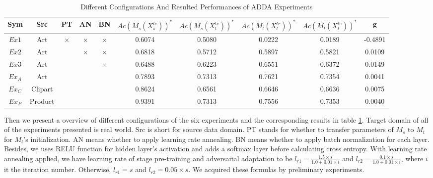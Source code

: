\documentclass[conference]{IEEEtran}
\begin{document}
 \begin{table}[h]
	\centering
	\caption{Different Configurations And Resulted Performances of ADDA Experiments}
	\label{tab:ConfigADDA}
	\begin{tabular}{cccccccccc}
		\hline
		Sym & Src & PT & AN & BN & $Ac(M_s(X^{te}_s))^*$ & $Ac(M_s(X^{te}_t))^*$ & $Ac(M_t(X^{tr}_t))^*$ & $Ac(M_t(X^{te}_t))^*$ & g\\
		\hline
		\hline
        $Ex1$ & Art & $\times$ & $\times$ & $\times$ & 0.6074 & 0.5080 & 0.0222 & 0.0189  & -0.4891\\
		$Ex2$ &  Art & \checkmark & $\times$ & $\times$ & 0.6818 & 0.5712 & 0.5897 & 0.5821 & 0.0109\\
		$Ex3$ &  Art & \checkmark & \checkmark & $\times$ & 0.6488 & 0.6223 & 0.6551 & 0.6372 & 0.0149\\
		$Ex_A$ &  Art & \checkmark & \checkmark & \checkmark & 0.7893 & 0.7313 & 0.7621 & 0.7354 & 0.0041\\
		$Ex_C$ &  Clipart & \checkmark & \checkmark & \checkmark & 0.8624 & 0.6561 & 0.6646 & 0.6636 & 0.0075\\
		$Ex_P$ &  Product & \checkmark & \checkmark & \checkmark & 0.9391 & 0.7313 & 0.7556 & 0.7353 & 0.0040\\
		\hline
	\end{tabular}
\end{table}
Then we present a overview of different configurations of the six experiments and the corresponding results in table \ref{tab:ConfigADDA}. Target domain of all of the experiments presented is real world. Src is short for source data domain. PT stands for whether to transfer parameters of $M_s$ to $M_t$ for $M_t$'s initialization. AN means whether to apply learning rate annealing. BN means whether to apply batch normalization for each layer. Besides, we uses RELU function for hidden layer's activation and adds a softmax layer before calculating cross entropy. With learning rate annealing applied, we have learning rate of stage pre-training and adversarial adaptation to be $l_{r1}=\frac{1.5 \times s}{1.0 + 0.01 \times i}$ and $l_{r2}=\frac{0.1 \times s}{1.0 + 0.01 \times i}$, where $i$ it the iteration number. Otherwise, $l_{r1}=s$ and $l_{r2}=0.05 \times s$. We acquired these formulas by preliminary experiments.
\end{document}
